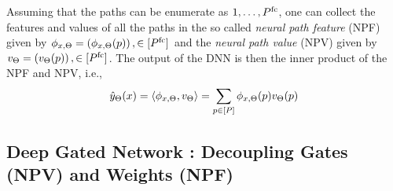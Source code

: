 \begin{proposition}
 Assuming that the paths can be enumerate as $1,\ldots, P^{\text{fc}}$, one can collect the features and values of all the paths in the so called \emph{neural path feature} (NPF) given by $\phi_{x,\Theta}=\left(\phi_{x,\Theta}(p)\right),\in[P^{\text{fc}}]$ and the \emph{neural path value} (NPV) given by $v_{\Theta}=\left(v_{\Theta}(p)\right),\in[P^{\text{fc}}]$. The output of the DNN is then the inner product of the NPF and NPV, i.e., 
\begin{align}
\hat{y}_{\Theta}(x)=\langle \phi_{x,\Theta},v_{\Theta}\rangle=\sum_{p\in[P]}  \phi_{x,\Theta}(p) v_{\Theta}(p)
\end{align}
\end{proposition}


\subsection{Deep Gated Network : Decoupling Gates (NPV) and Weights (NPF) }\label{sec:dgn}

